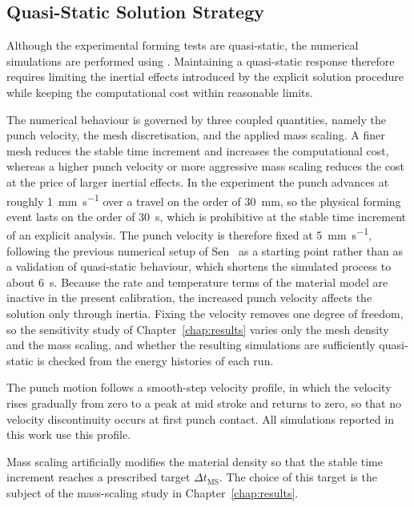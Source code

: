 \subsection{Quasi-Static Solution Strategy}

Although the experimental forming tests are quasi-static, the numerical
simulations are performed using . Maintaining a
quasi-static response therefore requires limiting the inertial effects
introduced by the explicit solution procedure while keeping the computational
cost within reasonable limits.

The numerical behaviour is governed by three coupled quantities, namely the
punch velocity, the mesh discretisation, and the applied mass scaling. A finer
mesh reduces the stable time increment and increases the computational cost,
whereas a higher punch velocity or more aggressive mass scaling reduces the
cost at the price of larger inertial effects. In the experiment the punch
advances at roughly \SI{1}{\milli\meter\per\second} over a travel on the order
of \SI{30}{\milli\meter}, so the physical forming event lasts on the order of
\SI{30}{\second}, which is prohibitive at the stable time increment of an
explicit analysis. The punch velocity is therefore fixed at
\SI{5}{\milli\meter\per\second}, following the previous numerical setup of
Sen~\cite{Sen2025} as a starting point rather than as a validation of
quasi-static behaviour, which shortens the simulated process to about
\SI{6}{\second}. Because the rate and temperature terms of the material model
are inactive in the present calibration, the increased punch velocity affects
the solution only through inertia. Fixing the velocity removes one degree of
freedom, so the sensitivity study of Chapter~\ref{chap:results} varies only
the mesh density and the mass scaling, and whether the resulting simulations
are sufficiently quasi-static is checked from the energy histories of each
run.

The punch motion follows a smooth-step velocity profile, in which the velocity
rises gradually from zero to a peak at mid stroke and returns to zero, so that
no velocity discontinuity occurs at first punch contact. All simulations
reported in this work use this profile.

Mass scaling artificially modifies the material density so that the stable
time increment reaches a prescribed target $\Delta t_\mathrm{MS}$. The choice
of this target is the subject of the mass-scaling study in
Chapter~\ref{chap:results}.

